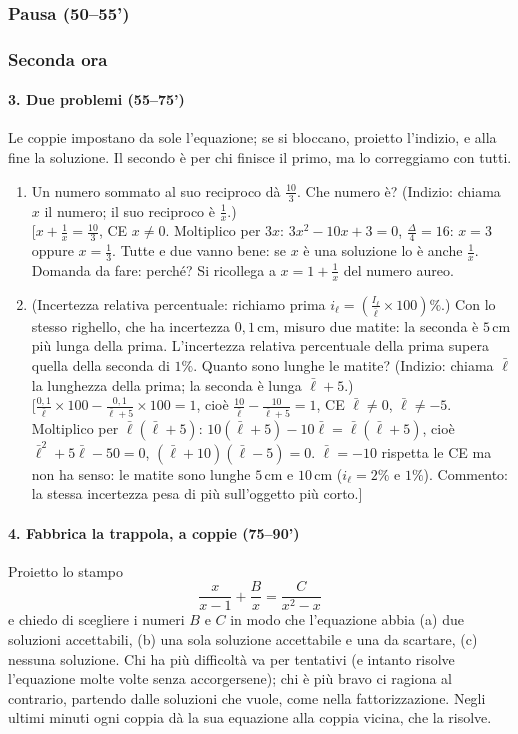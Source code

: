 \documentclass[11pt]{report}
\begin{document}
\subsubsection*{Pausa (50--55')}

\subsubsection*{Seconda ora}

\paragraph{3. Due problemi (55--75')}
Le coppie impostano da sole l'equazione; se si bloccano, proietto l'indizio, e alla fine la soluzione. Il secondo è per chi finisce il primo, ma lo correggiamo con tutti.

\begin{enumerate}
    \item Un numero sommato al suo reciproco dà $\frac{10}{3}$. Che numero è? (Indizio: chiama $x$ il numero; il suo reciproco è $\frac1x$.)\\
    {[}$x+\frac1x=\frac{10}{3}$, CE $x\neq0$. Moltiplico per $3x$: $3x^2-10x+3=0$, $\frac\Delta4=16$: $x=3$ oppure $x=\frac13$. Tutte e due vanno bene: se $x$ è una soluzione lo è anche $\frac1x$. Domanda da fare: perché? Si ricollega a $x=1+\frac1x$ del numero aureo.

    \item (Incertezza relativa percentuale: richiamo prima $i_\ell=\left(\frac{I_\ell}{\bar\ell}\times100\right)\%$.) Con lo stesso righello, che ha incertezza $0{,}1\,$cm, misuro due matite: la seconda è $5\,$cm più lunga della prima. L'incertezza relativa percentuale della prima supera quella della seconda di $1\%$. Quanto sono lunghe le matite? (Indizio: chiama $\bar\ell$ la lunghezza della prima; la seconda è lunga $\bar\ell+5$.)\\
    {[}$\frac{0{,}1}{\bar\ell}\times100-\frac{0{,}1}{\bar\ell+5}\times100=1$, cioè $\frac{10}{\bar\ell}-\frac{10}{\bar\ell+5}=1$, CE $\bar\ell\neq0$, $\bar\ell\neq-5$. Moltiplico per $\bar\ell(\bar\ell+5)$: $10(\bar\ell+5)-10\bar\ell=\bar\ell(\bar\ell+5)$, cioè $\bar\ell^2+5\bar\ell-50=0$, $(\bar\ell+10)(\bar\ell-5)=0$. $\bar\ell=-10$ rispetta le CE ma non ha senso: le matite sono lunghe $5\,$cm e $10\,$cm ($i_\ell=2\%$ e $1\%$). Commento: la stessa incertezza pesa di più sull'oggetto più corto.{]}
\end{enumerate}

\paragraph{4. Fabbrica la trappola, a coppie (75--90')}
Proietto lo stampo
$$
\frac{x}{x-1}+\frac{B}{x}=\frac{C}{x^2-x}
$$
e chiedo di scegliere i numeri $B$ e $C$ in modo che l'equazione abbia (a) due soluzioni accettabili, (b) una sola soluzione accettabile e una da scartare, (c) nessuna soluzione. Chi ha più difficoltà va per tentativi (e intanto risolve l'equazione molte volte senza accorgersene); chi è più bravo ci ragiona al contrario, partendo dalle soluzioni che vuole, come nella fattorizzazione. Negli ultimi minuti ogni coppia dà la sua equazione alla coppia vicina, che la risolve.
\end{document}
